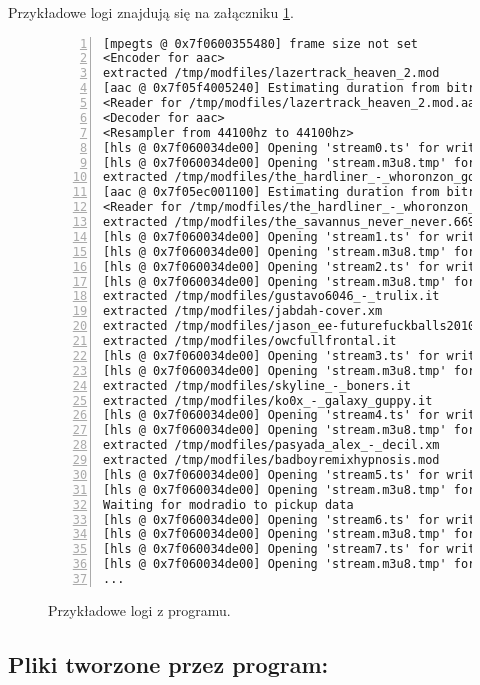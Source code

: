 \documentclass[a4paper,12pt]{article}
\begin{document}
Przykładowe logi znajdują się na załączniku \ref{lst:logs}.

\begin{figure}[h]
\begin{lstlisting}[frame=LB,basicstyle=\ttfamily\scriptsize, numbers=left]
[mpegts @ 0x7f0600355480] frame size not set
<Encoder for aac>
extracted /tmp/modfiles/lazertrack_heaven_2.mod
[aac @ 0x7f05f4005240] Estimating duration from bitrate, this may be inaccurate
<Reader for /tmp/modfiles/lazertrack_heaven_2.mod.aac>
<Decoder for aac>
<Resampler from 44100hz to 44100hz>
[hls @ 0x7f060034de00] Opening 'stream0.ts' for writing
[hls @ 0x7f060034de00] Opening 'stream.m3u8.tmp' for writing
extracted /tmp/modfiles/the_hardliner_-_whoronzon_gohonzon.xm
[aac @ 0x7f05ec001100] Estimating duration from bitrate, this may be inaccurate
<Reader for /tmp/modfiles/the_hardliner_-_whoronzon_gohonzon.xm.aac>
extracted /tmp/modfiles/the_savannus_never_never.669
[hls @ 0x7f060034de00] Opening 'stream1.ts' for writing
[hls @ 0x7f060034de00] Opening 'stream.m3u8.tmp' for writing
[hls @ 0x7f060034de00] Opening 'stream2.ts' for writing
[hls @ 0x7f060034de00] Opening 'stream.m3u8.tmp' for writing
extracted /tmp/modfiles/gustavo6046_-_trulix.it
extracted /tmp/modfiles/jabdah-cover.xm
extracted /tmp/modfiles/jason_ee-futurefuckballs2010_cover.it
extracted /tmp/modfiles/owcfullfrontal.it
[hls @ 0x7f060034de00] Opening 'stream3.ts' for writing
[hls @ 0x7f060034de00] Opening 'stream.m3u8.tmp' for writing
extracted /tmp/modfiles/skyline_-_boners.it
extracted /tmp/modfiles/ko0x_-_galaxy_guppy.it
[hls @ 0x7f060034de00] Opening 'stream4.ts' for writing
[hls @ 0x7f060034de00] Opening 'stream.m3u8.tmp' for writing
extracted /tmp/modfiles/pasyada_alex_-_decil.xm
extracted /tmp/modfiles/badboyremixhypnosis.mod
[hls @ 0x7f060034de00] Opening 'stream5.ts' for writing
[hls @ 0x7f060034de00] Opening 'stream.m3u8.tmp' for writing
Waiting for modradio to pickup data
[hls @ 0x7f060034de00] Opening 'stream6.ts' for writing
[hls @ 0x7f060034de00] Opening 'stream.m3u8.tmp' for writing
[hls @ 0x7f060034de00] Opening 'stream7.ts' for writing
[hls @ 0x7f060034de00] Opening 'stream.m3u8.tmp' for writing
...
\end{lstlisting}
\centering
    \caption{Przykładowe logi z programu.}
    \label{lst:logs}
\end{figure}

\subsection*{Pliki tworzone przez program:}
\end{document}
